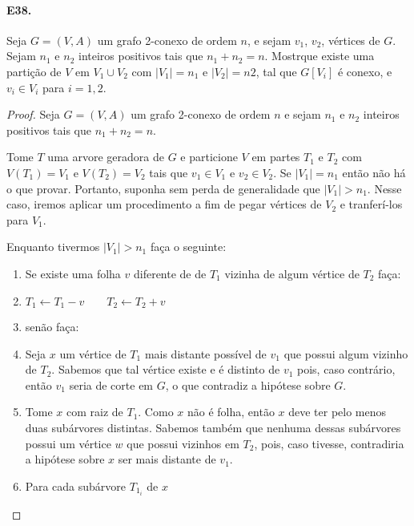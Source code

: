 \documentclass[11pt,a4paper,notitlepage]{exam}
\newcommand\Recebe{\leftarrow}
\begin{document}
\paragraph{E38.}Seja $G=(V,A)$ um grafo 2-conexo de ordem $n$, e sejam
$v_1$, $v_2$, vértices de $G$. Sejam $n_1$ e $n_2$ inteiros
positivos tais que $n_1+n_2=n$. Mostrque existe uma partição de $V$ em
$V_1\cup V_2$ com $|V_1| = n_1$ e $|V_2| = n2$, tal que $G[V_i]$
é conexo, e $v_i \in V_i$ para  $i=1,2$.
\begin{proof}
    Seja $G=(V,A)$ um grafo 2-conexo de ordem $n$ e sejam $n_1$ e $n_2$
    inteiros positivos tais que $n_1+n_2=n$.\par
    Tome $T$ uma arvore geradora de $G$ e particione $V$ em partes
    $T_1$ e
    $T_2$ com $V(T_1) = V_1$ e $V(T_2)=V_2$ tais que $v_1 \in V_1$ e $v_2 \in V_2$. Se $|V_1| = n_1$
    então não há o que provar. Portanto, suponha sem perda de
    generalidade que $|V_1| > n_1$. Nesse caso, iremos aplicar um
    procedimento a fim de pegar vértices de $V_2$ e tranferí-los para
    $V_1$.\par
    Enquanto tivermos $|V_1| > n_1$ faça o seguinte:
    \begin{enumerate}
        \item Se existe uma folha $v$ diferente de  de $T_1$ vizinha de algum vértice de $T_2$
            faça:
        \item \hspace*{20px} $T_1 \Recebe T_1 -v \qquad T_2 \Recebe
            T_2 + v$
        \item senão faça:
        \item    \hspace*{20px} Seja $x$ um vértice de $T_1$  mais distante
            possível de $v_1$ que possui algum vizinho de $T_2$.
            Sabemos que tal vértice existe e é distinto de $v_1$ pois, caso contrário, então $v_1$ seria de corte em $G$, o que
            contradiz a hipótese sobre $G$.
        \item \hspace*{20px} Tome $x$ com raiz de $T_1$. Como $x$ não
            é folha, então $x$ deve ter pelo menos duas
            subárvores distintas. Sabemos também que nenhuma dessas
            subárvores possui um vértice $w$ que possui
            vizinhos em $T_2$, pois, caso tivesse, contradiria a
            hipótese sobre $x$ ser mais distante de $v_1$.
        \item \hspace*{20px} Para cada subárvore $T_{1_i}$ de $x$

\end{enumerate}
\end{proof}
\end{document}
